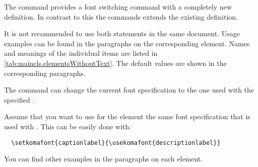 The command  provides a font switching command
with a completely new definition. In contrast to this the
 commands extends the existing definition.

It is not recommended to use both statements in the same
document.  Usage examples can be found in the paragraphs on the
corresponding element.  Names and meanings of the individual items are
listed in \autoref{tab:maincls.elementsWithoutText}.  The default
values are shown in the corresponding paragraphs.

The command  can change the current font
specification to the one used with the specified .
\begin{Example}
  Assume that you want to use for the element
   the same font specification that is used
  with . This can be easily done with:
\begin{lstlisting}
  \setkomafont{captionlabel}{\usekomafont{descriptionlabel}}
\end{lstlisting}
  You can find other examples in the paragraphs on each element.
\end{Example}

